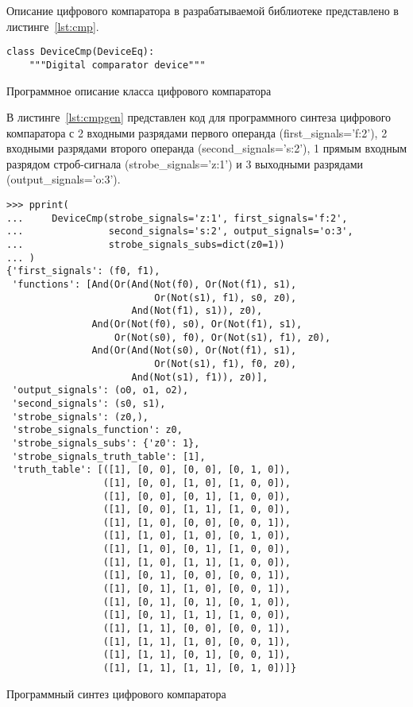 \documentclass[document.tex]{subfiles}
\begin{document}
Описание цифрового компаратора в разрабатываемой библиотеке представлено в
листинге~\ref{lst:cmp}.

\begin{listing}[ht]
\begin{verbatim}
class DeviceCmp(DeviceEq):
    """Digital comparator device"""
\end{verbatim}
\caption{Программное описание класса цифрового компаратора}
\label{lst:cmp}
\end{listing}

\clearpage
В листинге~\ref{lst:cmpgen} представлен код для программного синтеза
цифрового компаратора с 2 входными разрядами первого операнда
(first\_signals='f:2'), 2 входными разрядами второго операнда
(second\_signals='s:2'), 1 прямым входным разрядом строб-сигнала
(strobe\_signals='z:1') и 3 выходными разрядами (output\_signals='o:3').

\begin{listing}[ht]
\begin{verbatim}
>>> pprint(                                                                                             
...     DeviceCmp(strobe_signals='z:1', first_signals='f:2',                                            
...               second_signals='s:2', output_signals='o:3',                                           
...               strobe_signals_subs=dict(z0=1))                                                        
... )
{'first_signals': (f0, f1),
 'functions': [And(Or(And(Not(f0), Or(Not(f1), s1), 
                          Or(Not(s1), f1), s0, z0), 
                      And(Not(f1), s1)), z0),
               And(Or(Not(f0), s0), Or(Not(f1), s1), 
                   Or(Not(s0), f0), Or(Not(s1), f1), z0),
               And(Or(And(Not(s0), Or(Not(f1), s1), 
                          Or(Not(s1), f1), f0, z0), 
                      And(Not(s1), f1)), z0)],
 'output_signals': (o0, o1, o2),
 'second_signals': (s0, s1),
 'strobe_signals': (z0,),
 'strobe_signals_function': z0,
 'strobe_signals_subs': {'z0': 1},
 'strobe_signals_truth_table': [1],
 'truth_table': [([1], [0, 0], [0, 0], [0, 1, 0]),
                 ([1], [0, 0], [1, 0], [1, 0, 0]),
                 ([1], [0, 0], [0, 1], [1, 0, 0]),
                 ([1], [0, 0], [1, 1], [1, 0, 0]),
                 ([1], [1, 0], [0, 0], [0, 0, 1]),
                 ([1], [1, 0], [1, 0], [0, 1, 0]),
                 ([1], [1, 0], [0, 1], [1, 0, 0]),
                 ([1], [1, 0], [1, 1], [1, 0, 0]),
                 ([1], [0, 1], [0, 0], [0, 0, 1]),
                 ([1], [0, 1], [1, 0], [0, 0, 1]),
                 ([1], [0, 1], [0, 1], [0, 1, 0]),
                 ([1], [0, 1], [1, 1], [1, 0, 0]),
                 ([1], [1, 1], [0, 0], [0, 0, 1]),
                 ([1], [1, 1], [1, 0], [0, 0, 1]),
                 ([1], [1, 1], [0, 1], [0, 0, 1]),
                 ([1], [1, 1], [1, 1], [0, 1, 0])]}
\end{verbatim}
\caption{Программный синтез цифрового компаратора}
\label{lst:cmpgen}
\end{listing}
\end{document}
